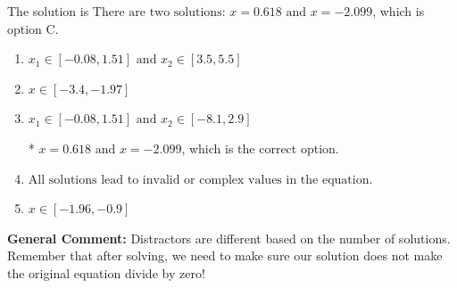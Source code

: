 \documentclass{extbook}[14pt]
\begin{document}
\begin{enumerate}
{The solution is \( \text{There are two solutions: } x = 0.618 \text{ and } x = -2.099 \), which is option C.\begin{enumerate}[label=\Alph*.]
\item \( x_1 \in [-0.08, 1.51] \text{ and } x_2 \in [3.5,5.5] \)


\item \( x \in [-3.4,-1.97] \)


\item \( x_1 \in [-0.08, 1.51] \text{ and } x_2 \in [-8.1,2.9] \)

* $x = 0.618 \text{ and } x = -2.099$, which is the correct option.
\item \( \text{All solutions lead to invalid or complex values in the equation.} \)


\item \( x \in [-1.96,-0.9] \)


\end{enumerate}

\textbf{General Comment:} Distractors are different based on the number of solutions. Remember that after solving, we need to make sure our solution does not make the original equation divide by zero!
}
\end{enumerate}
\end{document}
